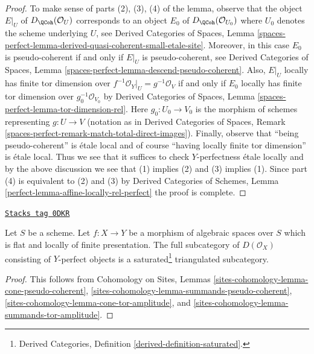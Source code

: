 \begin{proof}
To make sense of parts (2), (3), (4) of the lemma, observe that
the object $E|_U$ of $D_\QCoh(\mathcal{O}_U)$ corresponds to
an object $E_0$ of $D_\QCoh(\mathcal{O}_{U_0})$ where $U_0$
denotes the scheme underlying $U$, see Derived Categories of Spaces,
Lemma \ref{spaces-perfect-lemma-derived-quasi-coherent-small-etale-site}.
Moreover, in this case $E_0$ is pseudo-coherent if and only if
$E|_U$ is pseudo-coherent, see Derived Categories of Spaces,
Lemma \ref{spaces-perfect-lemma-descend-pseudo-coherent}.
Also, $E|_U$ locally has finite tor dimension over
$f^{-1}\mathcal{O}_Y|_U = g^{-1}\mathcal{O}_V$ if and only if
$E_0$ locally has finite tor dimension over $g_0^{-1}\mathcal{O}_{V_0}$
by Derived Categories of Spaces, Lemma
\ref{spaces-perfect-lemma-tor-dimension-rel}.
Here $g_0 : U_0 \to V_0$ is the morphism of schemes representing
$g : U \to V$ (notation as in Derived Categories of Spaces,
Remark \ref{spaces-perfect-remark-match-total-direct-images}).
Finally, observe that ``being pseudo-coherent'' is \'etale local and
of course ``having locally finite tor dimension'' is \'etale local.
Thus we see that it suffices to check $Y$-perfectness \'etale locally
and by the above discussion we see that (1) implies (2) and
(3) implies (1). Since part (4) is equivalent
to (2) and (3) by
Derived Categories of Schemes, Lemma
\ref{perfect-lemma-affine-locally-rel-perfect}
the proof is complete.
\end{proof}

\begin{lemma}[Triangulated]
\label{spaces-more-morphisms-lemma-triangulated}
\href{https://stacks.math.columbia.edu/tag/0DKR}{\texttt{Stacks tag 0DKR}}

Let $S$ be a scheme. Let $f : X \to Y$ be a morphism of
algebraic spaces over $S$ which is flat and locally of finite presentation.
The full subcategory of $D(\mathcal{O}_X)$ consisting of $Y$-perfect objects is
a saturated\footnote{Derived Categories, Definition
\ref{derived-definition-saturated}.} triangulated subcategory.
\end{lemma}

\begin{proof}
This follows from Cohomology on Sites, Lemmas
\ref{sites-cohomology-lemma-cone-pseudo-coherent},
\ref{sites-cohomology-lemma-summands-pseudo-coherent},
\ref{sites-cohomology-lemma-cone-tor-amplitude}, and
\ref{sites-cohomology-lemma-summands-tor-amplitude}.
\end{proof}

